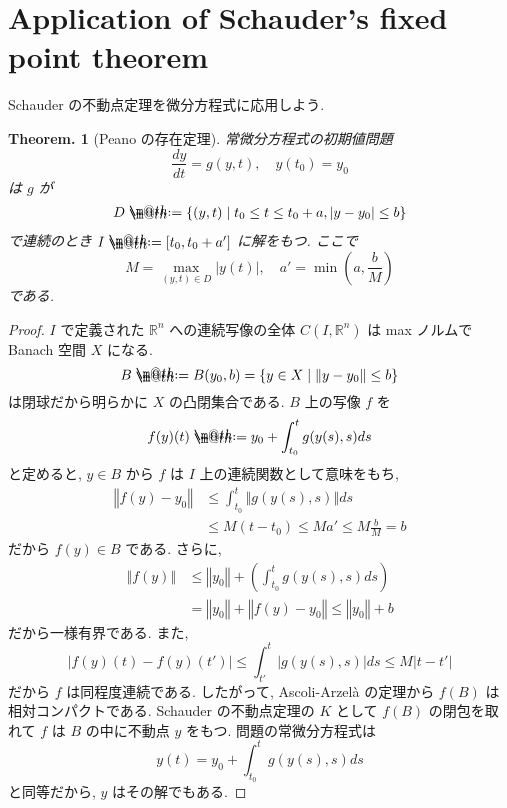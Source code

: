 \documentclass[openany, a4paper, oneside]{jsbook}
\makeatletter
\newcommand*{\defeq}{\mathrel{\rlap{%
\raisebox{0.3ex}{$\m@th\cdot$}}%
\raisebox{-0.3ex}{$\m@th\cdot$}}%
=}
\theoremstyle{break}
\theoremstyle{breakdefn}
\newtheorem{thm}{Theorem.}[section]
\newcommand{\abs}[1]{\left|#1\right|}
\newcommand{\norm}[1]{\left\Vert#1\right\Vert}
\newcommand{\rbk}[1]{\left (#1\right)}
\newcommand{\relmiddle}[1]{\mathrel{}\middle#1\mathrel{}}
\newcommand{\set}[2]{\left\{#1 \relmiddle| #2\right\}}
\newcommand{\bbRn}{\mathbb{R}^n}
\makeatother
\begin{document}
\section{Application of Schauder's fixed point theorem}


Schauder の不動点定理を微分方程式に応用しよう.
\begin{thm}[Peano の存在定理]
常微分方程式の初期値問題
\begin{equation}
 \frac{dy}{dt}
 =
 g (y, t), \quad y(t_0) =y_0
\end{equation}
は $g$ が
\begin{align}
 D
 \defeq
 \set{(y, t)}{t_0 \le t \le t_0 + a, |y - y_0| \le b}
\end{align}
で連続のとき $I \defeq [t_0, t_0 + a']$ に解をもつ.
ここで
\begin{equation}
 M = \max_{(y, t) \in D} |y (t)|, \quad a' = \min \rbk{a, \frac{b}{M}}
\end{equation}
である.
\end{thm}
\begin{proof}
$I$ で定義された $\bbRn$ への連続写像の全体 $C (I, \mathbb{R}^n)$ は max ノルムで Banach 空間 $X$ になる.
\begin{equation}
 B
 \defeq
 B (y_0, b)
 =
 \set{y \in X}{\norm{y - y_0} \le b }
\end{equation}
は閉球だから明らかに $X$ の凸閉集合である.
$B$ 上の写像 $f$ を
\begin{equation}
 f(y) (t)
 \defeq
 y_0 + \int_{t_0}^t g (y (s), s) ds
\end{equation}
と定めると, $y \in B$ から $f$ は $I$ 上の連続関数として意味をもち,
\begin{align}
 \norm{f (y) - y_0}
 &\le
 \int_{t_0}^t \norm{g (y (s), s)} ds \\
 &\le
 M (t - t_0)
 \le
 Ma'
 \le
 M\frac{b}{M}
 =
 b
\end{align}
だから $f (y) \in B$ である.
さらに,
\begin{align}
 \norm{f (y)}
 &\le
 \norm{y_0} + \rbk{\int_{t_0}^t g (y (s),s) ds} \\
 &=
 \norm{y_0} + \norm{f (y) - y_0}
 \le
 \norm{y_0} + b
\end{align}
だから一様有界である.
また,
\begin{equation}
 \abs{f (y) (t) - f (y) (t')}
 \le
 \int_{t'}^t \abs{g (y (s), s)} ds
 \le
 M \abs{t - t'}
\end{equation}
だから $f$ は同程度連続である.
したがって, Ascoli-Arzel\`a の定理から $f (B)$ は相対コンパクトである.
Schauder の不動点定理の $K$ として $f (B)$ の閉包を取れて $f$ は $B$ の中に不動点 $y$ をもつ.
問題の常微分方程式は
\begin{equation}
 y (t)
 =
 y_0 + \int_{t_0}^t g (y (s), s) ds
\end{equation}
と同等だから, $y$ はその解でもある.
\end{proof}
\end{document}
